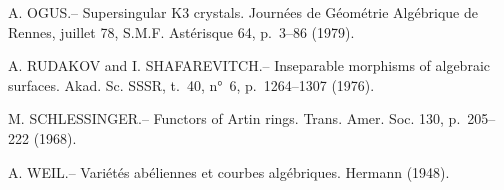 \documentclass[12pt,a4paper]{article}
\theoremstyle{plain}
\theoremstyle{definition}
\theoremstyle{remark}
\begin{document}
\begin{enumerate}[label={[\arabic*]}, leftmargin=2em, itemsep=0.3em]
\item[$\text{[13]}$] A. OGUS.-- Supersingular K3 crystals. Journées de Géométrie Algébrique de Rennes, juillet 78, S.M.F. Astérisque 64, p.~3--86 (1979).

\item[$\text{[14]}$] A. RUDAKOV and I. SHAFAREVITCH.-- Inseparable morphisms of algebraic surfaces. Akad. Sc. SSSR, t.~40, n°~6, p.~1264--1307 (1976).

\item[$\text{[15]}$] M. SCHLESSINGER.-- Functors of Artin rings. Trans. Amer. Soc. 130, p.~205--222 (1968).

\item[$\text{[16]}$] A. WEIL.-- Variétés abéliennes et courbes algébriques. Hermann (1948).
\end{enumerate}
\end{document}
